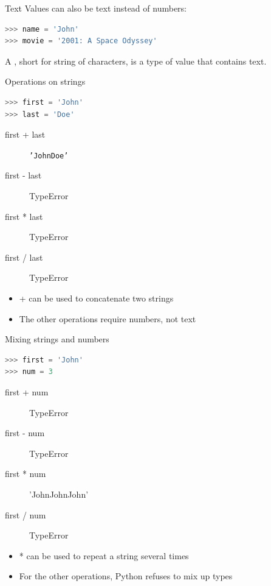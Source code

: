 \documentclass{beamer}
\begin{document}
\begin{frame}[fragile]{Text}
Values can also be text instead of numbers:
\begin{lstlisting}[language=python]
>>> name = 'John'
>>> movie = '2001: A Space Odyssey'
\end{lstlisting}

\pause
    \begin{definition}
        A , short for string of characters,
        is a type of value that contains text.
    \end{definition}
\end{frame}

\begin{frame}[fragile]{Operations on strings}
\begin{lstlisting}[language=python]
>>> first = 'John'
>>> last = 'Doe'
\end{lstlisting}
\begin{description}
    \item[first + last] \texttt{'JohnDoe'}
    \item[first - last] TypeError
    \item[first * last] TypeError
    \item[first / last] TypeError
\end{description}

\begin{itemize}
\item + can be used to concatenate two strings
\item The other operations require numbers, not text
\end{itemize}
\end{frame}

\begin{frame}[fragile]{Mixing strings and numbers}
\begin{lstlisting}[language=python]
>>> first = 'John'
>>> num = 3
\end{lstlisting}
\begin{description}
    \item[first + num] TypeError
    \item[first - num] TypeError
    \item[first * num] 'JohnJohnJohn'
    \item[first / num] TypeError
\end{description}

\begin{itemize}
\item * can be used to repeat a string several times
\item For the other operations, Python refuses to mix up types
\end{itemize}
\end{frame}
\end{document}
